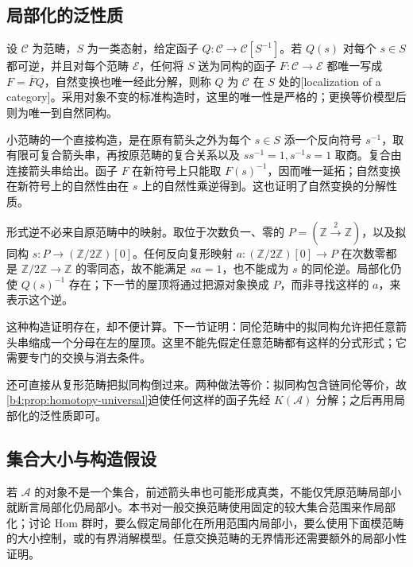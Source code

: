 \subsection{局部化的泛性质}
\label{b4:subsec:1701:02}

\begin{definition}\label{b4:def:category-localization}
	设 \(\mathcal C\) 为范畴，\(S\) 为一类态射，给定函子 \(Q:\mathcal C\to\mathcal C[S^{-1}]\)。若 \(Q(s)\) 对每个 \(s\in S\) 都可逆，并且对每个范畴 \(\mathcal E\)，任何将 \(S\) 送为同构的函子 \(F:\mathcal C\to\mathcal E\) 都唯一写成 \(F=\overline FQ\)，自然变换也唯一经此分解，则称 \(Q\) 为 \(\mathcal C\) 在 \(S\) 处的[localization of a category]。采用对象不变的标准构造时，这里的唯一性是严格的；更换等价模型后则为唯一到自然同构。
\end{definition}

小范畴的一个直接构造，是在原有箭头之外为每个 \(s\in S\) 添一个反向符号 \(s^{-1}\)，取有限可复合箭头串，再按原范畴的复合关系以及 \(ss^{-1}=1,s^{-1}s=1\) 取商。复合由连接箭头串给出。函子 \(F\) 在新符号上只能取 \(F(s)^{-1}\)，因而唯一延拓；自然变换在新符号上的自然性由在 \(s\) 上的自然性乘逆得到。这也证明了自然变换的分解性质。

\ProseParagraphBreak
形式逆不必来自原范畴中的映射。取位于次数负一、零的 \(P=(\mathbb Z\xrightarrow{2}\mathbb Z)\)，以及拟同构 \(s:P\to(\mathbb Z/2\mathbb Z)[0]\)。任何反向复形映射 \(a:(\mathbb Z/2\mathbb Z)[0]\to P\) 在次数零都是 \(\mathbb Z/2\mathbb Z\to\mathbb Z\) 的零同态，故不能满足 \(sa=1\)，也不能成为 \(s\) 的同伦逆。局部化仍使 \(Q(s)^{-1}\) 存在；下一节的屋顶将通过把源对象换成 \(P\)，而非寻找这样的 \(a\)，来表示这个逆。

\ProseParagraphBreak
这种构造证明存在，却不便计算。下一节证明：同伦范畴中的拟同构允许把任意箭头串缩成一个分母在左的屋顶。这里不能先假定任意范畴都有这样的分式形式；它需要专门的交换与消去条件。

\ProseParagraphBreak
还可直接从复形范畴把拟同构倒过来。两种做法等价：拟同构包含链同伦等价，故\cref{b4:prop:homotopy-universal}迫使任何这样的函子先经 \(K(\mathcal A)\) 分解；之后再用局部化的泛性质即可。

\subsection{集合大小与构造假设}
\label{b4:subsec:1701:03}

若 \(\mathcal A\) 的对象不是一个集合，前述箭头串也可能形成真类，不能仅凭原范畴局部小就断言局部化仍局部小。本书对一般交换范畴使用固定的较大集合范围来作局部化；讨论 Hom 群时，要么假定局部化在所用范围内局部小，要么使用下面模范畴的大小控制，或的有界消解模型。任意交换范畴的无界情形还需要额外的局部小性证明。

